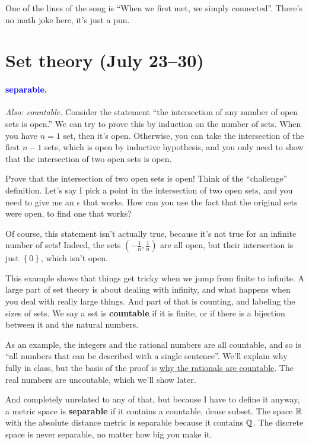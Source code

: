 \documentclass[11pt,paper=letter]{scrartcl}
\renewcommand{\bluebf}[1]{{\bfseries \color{Blue} #1}}
\renewcommand\wp[1]{\paragraph{\textcolor{Blue}{#1.}} \hspace{-1em}}
\newcommand\wl[1]{\label{w:#1}}
\newcommand\oww[1]{\textit{Also: #1.}}
\begin{document}
\begin{remboxed}
  One of the lines of the song is ``When we first met, we simply connected''. There's no math joke here, it's just a pun.
\end{remboxed}

\section{Set theory (July 23--30)}

\wp{separable}
\wl{separable}
\oww{countable}
Consider the statement ``the intersection of any number of open sets is open.'' We can try to prove this by induction on the number of sets. When you have $n = 1$ set, then it's open. Otherwise, you can take the intersection of the first $n - 1$ sets, which is open by inductive hypothesis, and you only need to show that the intersection of two open sets is open.

\begin{exrboxed}
  Prove that the intersection of two open sets is open! Think of the ``challenge'' definition. Let's say I pick a point in the intersection of two open sets, and you need to give me an $\epsilon$ that works. How can you use the fact that the original sets were open, to find one that works?
\end{exrboxed}

Of course, this statement isn't actually true, because it's not true for an infinite number of sets! Indeed, the sets $ \left( - \frac{1}{n} , \frac{1}{n} \right) $ are all open, but their intersection is just $ \left\{ 0 \right\}  $, which isn't open.

This example shows that things get tricky when we jump from finite to infinite. A large part of set theory is about dealing with infinity, and what happens when you deal with really large things. And part of that is counting, and labeling the sizes of sets. We say a set is \textbf{countable} if it is finite, or if there is a bijection between it and the natural numbers.

As an example, the integers and the rational numbers are all countable, and so is ``all numbers that can be described with a single sentence''. We'll explain why fully in class, but the basis of the proof is \href{https://proofwiki.org/wiki/Rational_Numbers_are_Countably_Infinite}{why the rationals are countable}. The real numbers are uncoutable, which we'll show later.

And completely unrelated to any of that, but because I have to define it anyway, a metric space is \bluebf{separable} if it contains a countable, dense subset. The space $\mathbb R$ with the absolute distance metric is separable because it contains $\mathbb Q$. The discrete space is never separable, no matter how big you make it.
\end{document}

